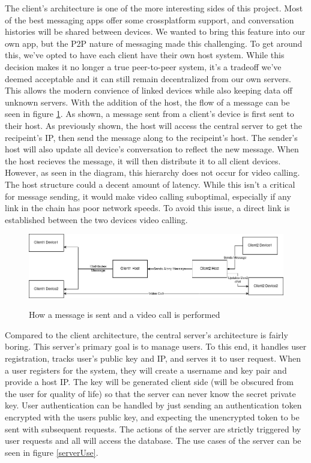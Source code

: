 \documentclass[titlepage]{article}
\begin{document}
    The client's architecture is one of the more interesting sides of this project.
    Most of the best messaging apps offer some crossplatform support, and conversation histories will be shared between devices.
    We wanted to bring this feature into our own app, but the P2P nature of messaging made this challenging.
    To get around this, we've opted to have each client have their own host system.
    While this decision makes it no longer a true peer-to-peer system, it's a tradeoff we've deemed acceptable and it can still remain decentralized from our own servers.
    This allows the modern convience of linked devices while also keeping data off unknown servers.
    With the addition of the host, the flow of a message can be seen in figure \ref{clientHost}.
    As shown, a message sent from a client's device is first sent to their host.
    As previously shown, the host will access the central server to get the recipeint's IP, then send the message along to the recipeint's host.
    The sender's host will also update all device's conversation to reflect the new message.
    When the host recieves the message, it will then distribute it to all client devices.
    However, as seen in the diagram, this hierarchy does not occur for video calling.
    The host structure could a decent amount of latency.
    While this isn't a critical for message sending, it would make video calling suboptimal, especially if any link in the chain has poor network speeds.
    To avoid this issue, a direct link is established between the two devices video calling.

    \begin{center}
        \begin{figure}[!ht]
            \includegraphics[scale=.5]{graphics/clientHost.png}
            \label{clientHost}
            \caption{How a message is sent and a video call is performed}
        \end{figure}
    \end{center}

    Compared to the client architecture, the central server's architecture is fairly boring.
    This server's primary goal is to manage users.
    To this end, it handles user registration, tracks user's public key and IP, and serves it to user request.
    When a user registers for the system, they will create a username and key pair and provide a host IP. 
    The key will be generated client side (will be obscured from the user for quality of life) so that the server can never know the secret private key.
    User authentication can be handled by just sending an authentication token encrypted with the users public key, and expecting the unencrypted token to be sent with subsequent requests.
    The actions of the server are strictly triggered by user requests and all will access the database.
    The use cases of the server can be seen in figure \ref{serverUse}.
\end{document}
